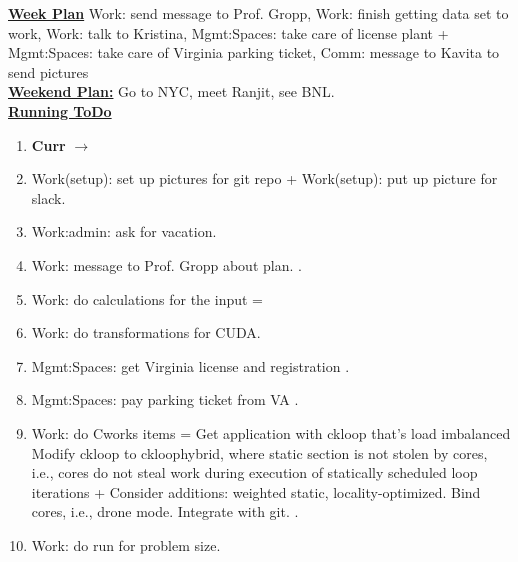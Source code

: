 {\underline{\bf Week Plan}  Work: send message to Prof. Gropp, Work: finish getting data set to work,
        Work: talk to Kristina, Mgmt:Spaces: take care of license
        plant + Mgmt:Spaces: take care of Virginia parking ticket,
        Comm: message to Kavita to send pictures}\\ 
      {\underline{\bf Weekend Plan:} Go to NYC, meet Ranjit, see
        BNL.}\\

    
      \underline{\bf Running ToDo} \\ %
        \begin{enumerate}
          
           
          \tiny \item \tiny \textbf{Curr} $\rightarrow$
        \item \tiny Work(setup): set up pictures for git repo +
          Work(setup): put up picture for slack. 
          
        \item \tiny Work:admin: ask for vacation.   

        \item \tiny Work: message to Prof. Gropp about plan.   . 
        \item \tiny Work: do calculations for the input =   
        \item \tiny Work: do transformations for CUDA.  


        \item \tiny Mgmt:Spaces: get Virginia license and registration . 

        \item \tiny Mgmt:Spaces: pay parking ticket from VA 
          . 


        \item \tiny Work: do Cworks items = Get application with
          ckloop that’s load imbalanced Modify ckloop to ckloophybrid, where
          static section is not stolen by cores, i.e., cores do not steal
          work during execution of statically scheduled loop iterations +
          Consider additions: weighted static, locality-optimized. Bind
          cores, i.e., drone mode. Integrate with git.  
           . 

        \item \tiny Work: do run for problem size.  


\end{enumerate}
